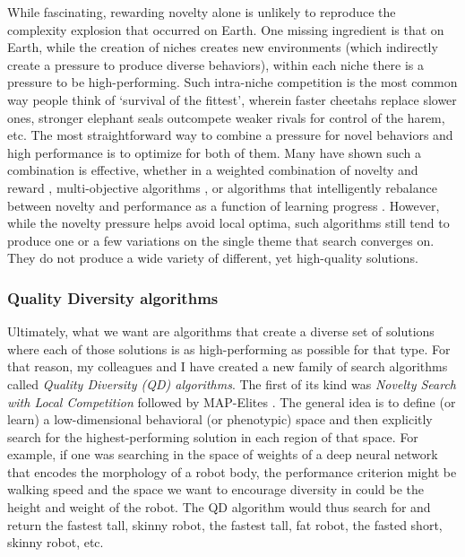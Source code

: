 \documentclass{article}
\begin{document}
While fascinating, rewarding novelty alone is unlikely to reproduce the complexity explosion that occurred on Earth. One missing ingredient is that on Earth, while the creation of niches creates new environments (which indirectly create a pressure to produce diverse behaviors), within each niche there is a pressure to be high-performing. Such intra-niche competition is the most common way people think of `survival of the fittest', wherein faster cheetahs replace slower ones, stronger elephant seals outcompete weaker rivals for control of the harem, etc. The most straightforward way to combine a pressure for novel behaviors and high performance is to optimize for both of them. Many have shown such a combination is effective, whether in a weighted combination of novelty and reward \cite{conti2018improving}, multi-objective algorithms \cite{Mouret2012,mouret2009overcoming}, or algorithms that intelligently rebalance between novelty and performance as a function of learning progress \cite{conti2018improving}. However, while the novelty pressure helps avoid local optima, such algorithms still tend to produce one or a few variations on the single theme that search converges on. They do not produce a wide variety of different, yet high-quality solutions. 

\subsubsection{Quality Diversity algorithms}

Ultimately, what we want are algorithms that create a diverse set of solutions where each of those solutions is as high-performing as possible for that type. For that reason, my colleagues and I have created a new family of search algorithms called \emph{Quality Diversity (QD) algorithms}. The first of its kind was \emph{Novelty Search with Local Competition}   \cite{lehman2011evolving} followed by MAP-Elites \cite{mouret2015illuminating}. The general idea is to define (or learn) a low-dimensional behavioral (or phenotypic) space and then explicitly search for the highest-performing solution in each region of that space. For example, if one was searching in the space of weights of a deep neural network that encodes the morphology of a robot body, the performance criterion might be walking speed and the space we want to encourage diversity in could be the height and weight of the robot. The QD algorithm would thus search for and return the fastest tall, skinny robot, the fastest tall, fat robot, the fasted short, skinny robot, etc. 
\end{document}
